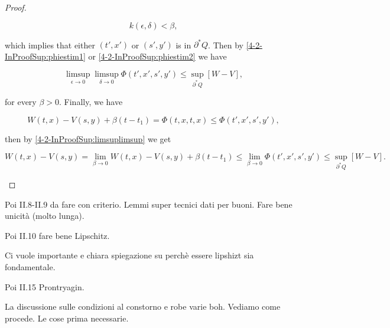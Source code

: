 \begin{proof}
\begin{enumerate}
        \[k(\epsilon,\delta) < \beta,\]

        which implies that either $(t',x')$ or $(s',y')$ is in $\partial^{\ast}Q$. Then by \ref{4-2-InProofSup:phiestim1} 
        or \ref{4-2-InProofSup:phiestim2} we have

        \begin{equation}\label{4-2-InProofSup:limsuplimsup}
            \limsup_{\epsilon\to0}\limsup_{\delta\to0} \Phi(t',x',s',y') \leq \sup_{\partial^{\ast}Q}[W-V],
        \end{equation}

        for every $\beta>0$. Finally, we have

        \[W(t,x) - V(s,y) + \beta(t-t_1) = \Phi(t,x,t,x) \leq \Phi(t',x',s',y'),\]

        then by \ref{4-2-InProofSup:limsuplimsup} we get

        \[W(t,x) - V(s,y) = \lim_{\beta\to0}W(t,x) - V(s,y) + \beta(t-t_1)\leq \lim_{\beta\to0}\Phi(t',x',s',y')\leq \sup_{\partial^{\ast}Q}[W-V].\]

    \end{enumerate}
\end{proof}

Poi II.8-II.9 da fare con criterio. Lemmi super tecnici dati per buoni. Fare bene unicità (molto lunga).

Poi II.10 fare bene Lipschitz.

Ci vuole importante e chiara spiegazione su perchè essere lipshizt sia fondamentale.

Poi II.15 Prontryagin.

La discussione sulle condizioni al constorno e robe varie boh. Vediamo come procede. Le cose prima necessarie.  